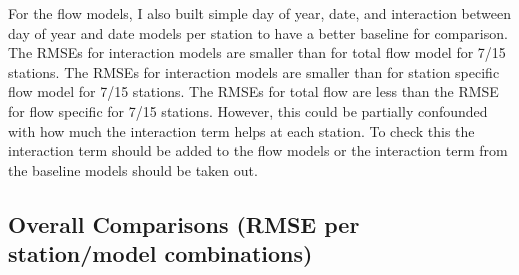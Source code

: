 \documentclass[12pt]{amsart}
\begin{document}

For the flow models, I also built simple day of year, date, and interaction between day of year and date models per station to have a better baseline for comparison.
The RMSEs for interaction models are smaller than for total flow model for 7/15 stations. The RMSEs for interaction models are smaller than for station specific flow model for 7/15 stations.  The RMSEs for total flow are less than the RMSE for flow specific for 7/15 stations.  However, this could be partially confounded with how much the interaction term helps at each station. To check this the interaction term should be added to the flow models or the interaction term from the baseline models should be taken out.

\subsection{Overall Comparisons (RMSE per station/model combinations)}
\end{document}

